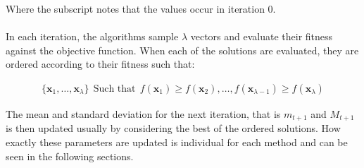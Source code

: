 Where the subscript notes that the values occur in iteration 0.\\
\\
In each iteration, the algorithms sample $\lambda$ vectors and evaluate their fitness
against the objective function. When each of the solutions are evaluated,
they are ordered according to their fitness such that:

\begin{align*}
\{\textbf{x}_{1}, \hdots, \textbf{x}_{\lambda}\}\ \ \text{Such that}\ \ 
f(\textbf{x}_1) \geq f(\textbf{x}_2), \hdots, f(\textbf{x}_{\lambda - 1}) \geq f(\textbf{x}_{\lambda})
\end{align*}

The mean and standard deviation for the next iteration, that is $m_{t+1}$ and $M_{t+1}$
is then updated usually by considering the best of the ordered solutions. How exactly
these parameters are updated is individual for each method and can be seen in the following
sections.




